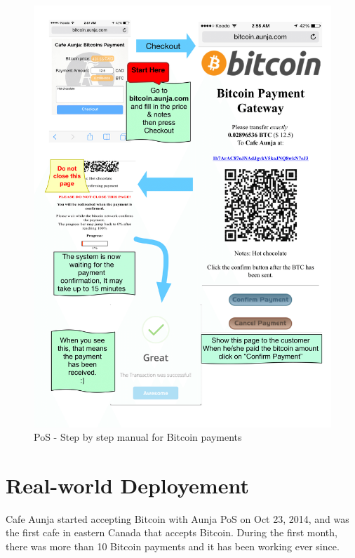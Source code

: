 \begin{figure}[htb!p]
\centering
\includegraphics[width=\linewidth]{fig/Payment_manual.png}
  \caption{PoS - Step by step manual for Bitcoin payments}
\label{fig:payment_manual}
\end{figure}



\section{Real-world Deployement}
Cafe Aunja started accepting Bitcoin with Aunja PoS on Oct 23, 2014, and was the first cafe in eastern Canada that accepts Bitcoin. During the first month, there was more than 10 Bitcoin payments and it has been working ever since.

